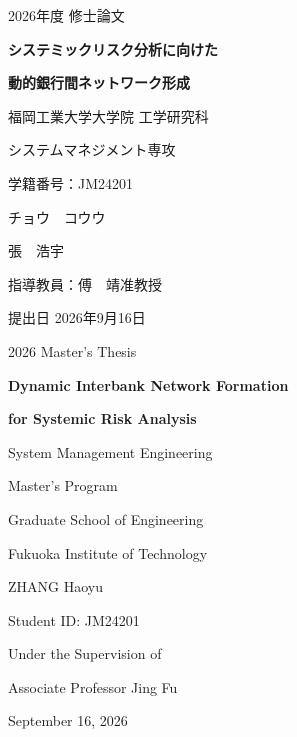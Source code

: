 \begin{titlepage}
\thispagestyle{empty}
\centering
{\Large 2026年度 修士論文\par}
\vspace{2.6cm}
{\LARGE\bfseries システミックリスク分析に向けた\par}
\vspace{0.4cm}
{\LARGE\bfseries 動的銀行間ネットワーク形成\par}
\vfill
{\large 福岡工業大学大学院 工学研究科\par}
\vspace{0.35cm}
{\large システムマネジメント専攻\par}
\vspace{1.5cm}
{\large 学籍番号：JM24201\par}
\vspace{0.25cm}
{\large チョウ　コウウ\par}
{\large 張　浩宇\par}
\vspace{1.35cm}
{\large 指導教員：傅　靖\quad 准教授\par}
\vfill
{\large 提出日 2026年9月16日\par}
\end{titlepage}

\begin{titlepage}
\thispagestyle{empty}
\centering
{\Large 2026 Master's Thesis\par}
\vspace{2.2cm}
{\LARGE\bfseries Dynamic Interbank Network Formation\par}
\vspace{0.35cm}
{\LARGE\bfseries for Systemic Risk Analysis\par}
\vfill
{\large System Management Engineering\par}
{\large Master's Program\par}
{\large Graduate School of Engineering\par}
{\large Fukuoka Institute of Technology\par}
\vspace{1.5cm}
{\large ZHANG Haoyu\par}
{\large Student ID: JM24201\par}
\vspace{1.35cm}
{\large Under the Supervision of\par}
{\large Associate Professor Jing Fu\par}
\vfill
{\large September 16, 2026\par}
\end{titlepage}

